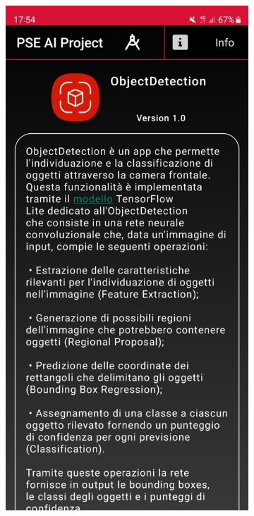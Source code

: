\begin{figure}[H]
  \centering
  \begin{subfigure}[b]{0.3\textwidth}
    \includegraphics[width=\textwidth, height=0.4\textheight]{Immagini/App/info_scuro.jpeg}

\end{subfigure}
\end{figure}
